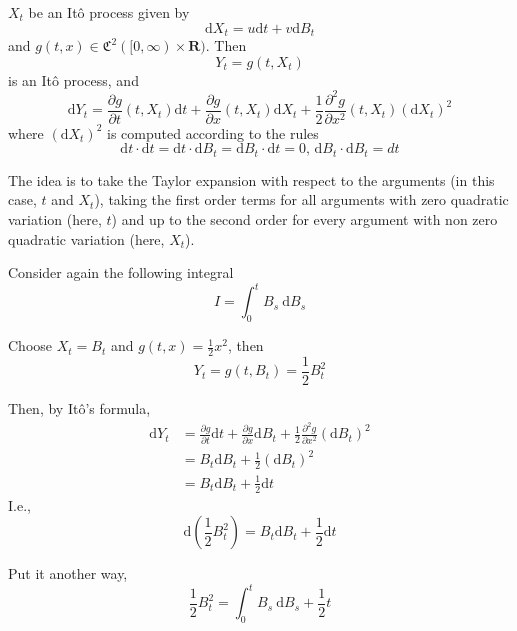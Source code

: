 \begin{theorem}
    $X_t$ be an Itô process given by 
    \begin{equation*}
        \mathrm{d}X_t = u \mathrm{d}t + v \mathrm{d}B_t
    \end{equation*}
    and $g(t,x) \in \mathfrak{C}^2([0, \infty) \times \textbf{R})$. Then 
    \[
        Y_t = g(t, X_t)
    \]
    is an Itô process, and
    \begin{equation}
        \mathrm{d}Y_t = \frac{\partial g}{\partial t}(t, X_t) \mathrm{d}t + \frac{\partial g}{\partial x}(t, X_t) \mathrm{d}X_t + \frac{1}{2}\frac{\partial^2 g}{\partial x^2}(t, X_t)(\mathrm{d}X_t)^2
    \end{equation}
    where $(\mathrm{d}X_t)^2$ is computed according to the rules
    \[
        \mathrm{d}t \cdot \mathrm{d}t = \mathrm{d}t \cdot \mathrm{d}B_t = \mathrm{d}B_t \cdot \mathrm{d}t = 0, \, \mathrm{d}B_t \cdot \mathrm{d}B_t = dt
    \]
\end{theorem}

The idea is to take the Taylor expansion with respect to the arguments (in this case, $t$ and $X_t$), taking the first order terms for all arguments with zero quadratic variation (here, $t$) and up to the second order for every argument with non zero quadratic variation (here, $X_t$).

\begin{example}
    Consider again the following integral
    \begin{equation*}
        I = \int_0^t B_s ~\mathrm{d}B_s
    \end{equation*}

    Choose $X_t = B_t$ and $g(t,x) = \frac{1}{2}x^2$, then 
    \[
        Y_t = g(t,B_t) = \frac{1}{2}B_t^2
    \]

    Then, by Itô's formula,
    \begin{equation*}
        \begin{aligned}
            \mathrm{d}Y_t   &= \frac{\partial g}{\partial t} \mathrm{d}t + \frac{\partial g}{\partial x} \mathrm{d}B_t + \frac{1}{2}\frac{\partial^2 g}{\partial x^2} (\mathrm{d}B_t)^2 \\
                            &= B_t \mathrm{d}B_t + \frac{1}{2}(\mathrm{d}B_t)^2 \\
                            &= B_t \mathrm{d}B_t + \frac{1}{2} \mathrm{d}t
        \end{aligned}
    \end{equation*}
    I.e.,
    \[
        \mathrm{d}\left( \frac{1}{2} B_t^2 \right) = B_t \mathrm{d}B_t + \frac{1}{2} \mathrm{d}t
    \]

    Put it another way,
    \begin{equation*}
        \frac{1}{2} B_t^2 = \int_0^t B_s ~\mathrm{d}B_s + \frac{1}{2}t
    \end{equation*}
\end{example}

